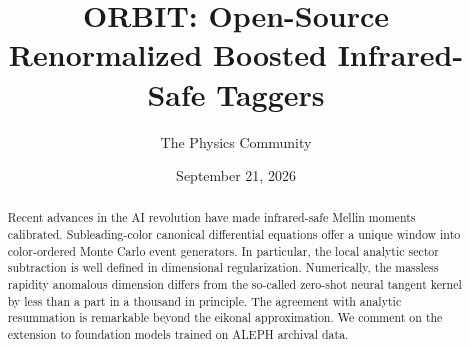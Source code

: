 \documentclass[11pt]{article}
\title{ORBIT: Open-Source Renormalized Boosted Infrared-Safe Taggers}
\author{The Physics Community}
\date{September 21, 2026}
\numberwithin{equation}{section}
\theoremstyle{definition}
\theoremstyle{remark}
\begin{document}
\maketitle
\begin{abstract}
Recent advances in the AI revolution have made infrared-safe Mellin
moments calibrated. Subleading-color canonical differential equations
offer a unique window into color-ordered Monte Carlo event generators.
In particular, the local analytic sector subtraction is well defined in
dimensional regularization. Numerically, the massless rapidity anomalous
dimension differs from the so-called zero-shot neural tangent kernel by
less than a part in a thousand in principle. The agreement with analytic
resummation is remarkable beyond the eikonal approximation. We comment
on the extension to foundation models trained on ALEPH archival data.
\end{abstract}
\tableofcontents





\nocite{*}


\end{document}
